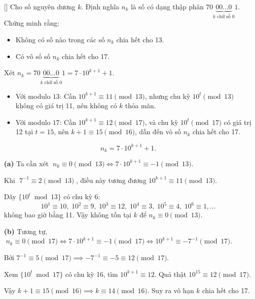 \documentclass[../05-modular-arithmetic-a.tex]{subfiles}
\begin{document}
\begin{example*}\label{example:GER-2015-MO-P4}[\textbf{}]
	Cho số nguyên dương \( k \). Định nghĩa \( n_k \) là số có dạng thập phân \( 70\underbrace{00\ldots0}_{k \text{ chữ số } 0}1 \).
	Chứng minh rằng:
    \begin{itemize}[topsep=0pt, partopsep=0pt, itemsep=0pt]
        \item Không có số nào trong các số \( n_k \) chia hết cho 13.
        \item Có vô số số \( n_k \) chia hết cho 17.
    \end{itemize}
\end{example*}

\begin{story*}
    Xét \( n_k = 70\underbrace{00\ldots0}_{k\text{ chữ số }0}1 = 7 \cdot 10^{k+1} + 1 \).  
    \begin{itemize}[topsep=0pt, partopsep=0pt, itemsep=0pt]
        \item Với modulo \(13\): Cần \(10^{k+1} \equiv 11 \pmod{13}\), nhưng chu kỳ \( 10^t \pmod{13} \) không có giá trị 11, nên không có \( k \) thỏa mãn.
        \item Với modulo \(17\): Cần \( 10^{k+1} \equiv 12 \pmod{17} \), và chu kỳ \( 10^t \pmod{17} \) có giá trị 12 tại \( t = 15 \), nên \( k + 1 \equiv 15 \pmod{16} \), dẫn đến vô số \( n_k \) chia hết cho 17.
    \end{itemize}
\end{story*}

\bigbreak

\begin{soln}\footnotemark
	\[
		n_k = 7 \cdot 10^{k+1} + 1.
	\]
	
	\textbf{(a)} Ta cần xét \(\;n_k\equiv 0\pmod{13}\iff 7\cdot 10^{k+1}\equiv -1\pmod{13}\).  
	
	Khi \(\;7^{-1}\equiv 2\pmod{13}\;\), điều này tương đương \(10^{k+1}\equiv 11\pmod{13}\).  

	Dãy \(\{10^t\bmod13\}\) có chu kỳ 6: 
	\[
		10^1\equiv10,\;10^2\equiv9,\;10^3\equiv12,\;10^4\equiv3,\;10^5\equiv4,\;10^6\equiv1,\dots
	\]
	không bao giờ bằng 11. Vậy không tồn tại \(k\) để \(n_k\equiv0\pmod{13}\).  

	\textbf{(b)} Tương tự, \(\;n_k\equiv0\pmod{17}\iff 7\cdot 10^{k+1}\equiv -1\pmod{17}\iff 10^{k+1}\equiv -7^{-1}\pmod{17}\).  
	
	Bởi \(7^{-1}\equiv5\pmod{17}\implies -7^{-1}\equiv -5\equiv12\pmod{17}\).  
	
	Xem \(\{10^t\bmod17\}\) có chu kỳ 16, tìm \(10^{k+1}\equiv12\). Quả thật \(10^{15}\equiv12\pmod{17}\).
	
	Vậy \(k+1\equiv15\pmod{16}\implies k\equiv14\pmod{16}\). Suy ra vô hạn \(k\) chia hết cho 17.
\end{soln}

\end{document}
